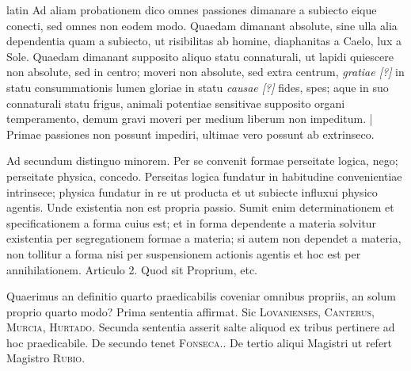 \begin{otherlanguage*}{latin}
\pstart
Ad aliam probationem dico omnes passiones dimanare a subiecto eique conecti, sed omnes non eodem modo. Quaedam dimanant absolute, sine ulla alia dependentia quam a subiecto, ut risibilitas ab homine, diaphanitas a Caelo, lux a Sole. Quaedam dimanant supposito aliquo statu connaturali, ut lapidi quiescere non absolute, sed in centro; moveri non absolute, sed extra centrum, \emph{gratiae [?]} in statu consummationis lumen gloriae in statu \emph{causae [?]} fides, spes; aque in suo connaturali statu frigus, animali potentiae sensitivae supposito organi temperamento, demum gravi moveri per medium liberum non impeditum. \textnormal{|} Primae passiones non possunt impediri, ultimae vero possunt ab extrinseco. 
\pend

\pstart
Ad secundum distinguo minorem. Per se convenit formae perseitate logica, nego; perseitate physica, concedo. Perseitas logica fundatur in habitudine convenientiae intrinsece; physica fundatur in re ut producta et ut subiecte influxui physico agentis. Unde existentia non est propria passio. Sumit enim determinationem et specificationem a forma cuius est; et in forma dependente a materia solvitur existentia per segregationem formae a materia; si autem non dependet a materia, non tollitur a forma nisi per suspensionem actionis agentis et hoc est per annihilationem. Articulo 2. Quod sit Proprium, etc. 
\pend

\pstart
{}
\pend

\pstart
Quaerimus an definitio quarto praedicabilis coveniar omnibus propriis, an solum proprio quarto modo? Prima sententia affirmat. Sic \textsc{Lovanienses}\index[persons]{}, \textsc{Canterus}, \textsc{Murcia}, \textsc{Hurtado}\index[persons]{}. Secunda sententia asserit salte aliquod ex tribus pertinere ad hoc praedicabile. De secundo tenet \textsc{Fonseca}.. De tertio aliqui Magistri ut refert Magistro \textsc{Rubio}. 
\pend


\end{otherlanguage*}
